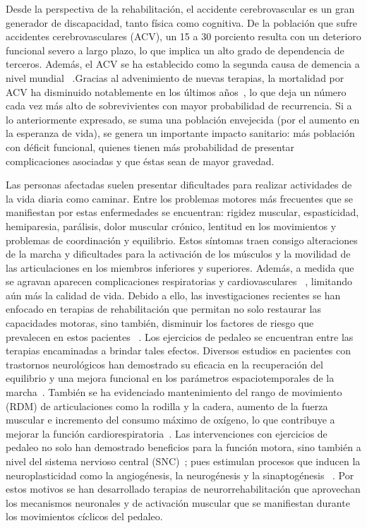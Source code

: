 \begin{introduction}
    Desde la perspectiva de la rehabilitación, el accidente cerebrovascular es un gran generador de discapacidad, tanto física como cognitiva. De la población que sufre accidentes cerebrovasculares (ACV), un 15 a 30 porciento resulta con un deterioro funcional severo a largo plazo, lo que implica un alto grado de dependencia de terceros. Además, el ACV se ha establecido como la segunda causa de demencia a nivel mundial~\cite{moyano2010accidente} .Gracias al advenimiento de nuevas terapias, la mortalidad por ACV ha disminuido notablemente en los últimos años~\cite{cuadrado2009rehabilitacion,harold2007guidelines}, lo que deja un número cada vez más alto de sobrevivientes con mayor probabilidad de recurrencia. Si a lo anteriormente expresado, se suma una población envejecida (por el aumento en la esperanza de vida), se genera un importante impacto sanitario: más población con déficit funcional, quienes tienen más probabilidad de presentar complicaciones asociadas y que éstas sean de mayor gravedad.

    Las personas afectadas suelen presentar dificultades para realizar actividades de la vida diaria como caminar. Entre los problemas motores más frecuentes que se manifiestan por estas enfermedades se encuentran: rigidez muscular, espasticidad, hemiparesia, parálisis, dolor muscular crónico, lentitud en los movimientos y problemas de coordinación y equilibrio. Estos síntomas traen consigo alteraciones de la marcha y dificultades para la activación de los músculos y la movilidad de las articulaciones en los miembros inferiores y superiores. Además, a medida que se agravan aparecen complicaciones respiratorias y cardiovasculares ~\cite{barbosa2015application, miner2020therapeutic}, limitando aún más la calidad de vida. Debido a ello, las investigaciones recientes se han enfocado en terapias de rehabilitación que permitan no solo restaurar las capacidades motoras, sino también, disminuir los factores de riesgo que prevalecen en estos pacientes ~\cite{barbosa2015application}. Los ejercicios de pedaleo se encuentran entre las terapias encaminadas a brindar tales efectos. Diversos estudios en pacientes con trastornos neurológicos han demostrado su eficacia en la recuperación del equilibrio y una mejora funcional en los parámetros espaciotemporales de la marcha~\cite{quiles2020lessons, el2021effect}. También se ha evidenciado mantenimiento del rango de movimiento (RDM) de articulaciones como la rodilla y la cadera, aumento de la fuerza muscular e incremento del consumo máximo de oxígeno, lo que contribuye a mejorar la función cardiorespiratoria~\cite{el2021effect, ashadi2016pengaruh}. Las intervenciones con ejercicios de pedaleo no solo han demostrado beneficios para la función motora, sino también a nivel del sistema nervioso central (SNC)~\cite{linder2019forced, alberts2011not}; pues estimulan procesos que inducen la neuroplasticidad como la angiogénesis, la neurogénesis y la sinaptogénesis ~\cite{linder2019forced, el2021effect}. Por estos motivos se han desarrollado terapias de neurorrehabilitación que aprovechan 
    los mecanismos neuronales y de activación muscular que se manifiestan durante los movimientos cíclicos del pedaleo. 
    

\end{introduction}
